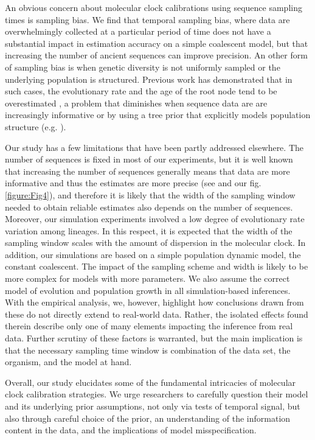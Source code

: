 \documentclass[11pt]{article}
\begin{document}
An obvious concern about molecular clock calibrations using sequence sampling times is sampling bias. We find that temporal sampling bias, where data are overwhelmingly collected at a particular period of time does not have a substantial impact in estimation accuracy on a simple coalescent model, but that increasing the number of ancient sequences can improve precision. An other form of sampling bias is when genetic diversity is not uniformly sampled or the underlying population is structured. Previous work has demonstrated that in such cases, the evolutionary rate and the age of the root node tend to be overestimated \citep{moller2018impact}, a problem that diminishes when sequence data are are increasingly informative or by using  a tree prior that explicitly models population structure (e.g. \citealt{kuhnert2016phylodynamics, muller2017structured}). 

Our study has a few limitations that have been partly addressed elsewhere. The number of sequences is fixed in most of our experiments, but it is well known that increasing the number of sequences generally means that data are more informative and thus the estimates are more precise (see \cite{moller2018impact} and our fig. \ref{figure:Fig4}), and therefore it is likely that the width of the sampling window needed to obtain reliable estimates also depends on the number of sequences. Moreover, our simulation experiments involved a low degree of evolutionary rate variation among lineages. In this respect, it is expected that the width of the sampling window scales with the amount of dispersion in the molecular clock. In addition, our simulations are based on a simple population dynamic model, the constant coalescent. The impact of the sampling scheme and width is likely to be more complex for models with more parameters. We also assume the correct model of evolution and population growth in all simulation-based inferences. With the empirical analysis, we, however, highlight how conclusions drawn from these do not directly extend to real-world data. Rather, the isolated effects found therein describe only one of many elements impacting the inference from real data. Further scrutiny of these factors is warranted, but the main implication is that the necessary sampling time window is combination of the data set, the organism, and the model at hand. 

Overall, our study elucidates some of the fundamental intricacies of molecular clock calibration strategies. We urge researchers to carefully question their model and its underlying prior assumptions, not only via tests of temporal signal, but also through careful choice of the prior, an understanding of the information content in the data, and the implications of model misspecification.
\end{document}
